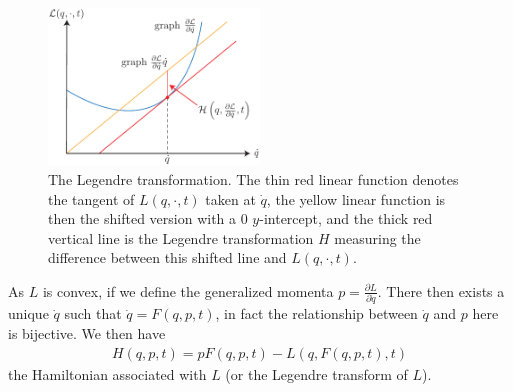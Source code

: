 \begin{ex}
\begin{figure}[h!]
	\centering
	\includegraphics[width=0.5\textwidth]{figures/ch8/2legendre_trafo.pdf}
	\caption{The Legendre transformation. The thin red linear function denotes the tangent of $L(q, \cdot, t)$ taken at  $\dot{q}$, the yellow linear function is then the shifted version with a 0 $y$-intercept, and the thick red vertical line is the Legendre transformation $H$ measuring the difference between this shifted line and $L(q,\cdot, t)$.}
	\label{fig:legendre_trafo}
\end{figure}

As $L$ is convex, if we define the generalized momenta $p=\frac{\partial L}{\partial \dot{q}}$. There then exists a unique $\dot{q}$ such that $\dot{q} = F(q,p,t)$, in fact the relationship between $\dot{q}$ and $p$ here is bijective. We then have
\begin{align}
	H(q,p,t) = p F(q,p,t) - L (q, F(q,p,t), t)
\end{align}
the Hamiltonian associated with $L$ (or the Legendre transform of $L$).


\end{ex}
